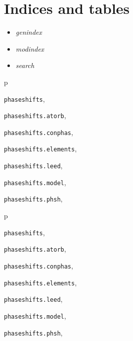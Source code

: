 \documentclass[letterpaper,10pt,english]{sphinxmanual}
\begin{document}
\chapter{Indices and tables}
\label{index:indices-and-tables}\begin{itemize}
\item {} 
\emph{genindex}

\item {} 
\emph{modindex}

\item {} 
\emph{search}

\end{itemize}


\renewcommand{\indexname}{Python Module Index}
\begin{theindex}
\def\bigletter#1{{\Large\sffamily#1}\nopagebreak\vspace{1mm}}
\bigletter{p}
\item {\texttt{phaseshifts}}, \pageref{modules:module-phaseshifts}
\item {\texttt{phaseshifts.atorb}}, \pageref{modules:module-phaseshifts.atorb}
\item {\texttt{phaseshifts.conphas}}, \pageref{modules:module-phaseshifts.conphas}
\item {\texttt{phaseshifts.elements}}, \pageref{modules:module-phaseshifts.elements}
\item {\texttt{phaseshifts.leed}}, \pageref{modules:module-phaseshifts.leed}
\item {\texttt{phaseshifts.model}}, \pageref{modules:module-phaseshifts.model}
\item {\texttt{phaseshifts.phsh}}, \pageref{modules:module-phaseshifts.phsh}
\end{theindex}
\renewcommand{\indexname}{Python Module Index}
\begin{theindex}
\def\bigletter#1{{\Large\sffamily#1}\nopagebreak\vspace{1mm}}
\bigletter{p}
\item {\texttt{phaseshifts}}, \pageref{modules:module-phaseshifts}
\item {\texttt{phaseshifts.atorb}}, \pageref{modules:module-phaseshifts.atorb}
\item {\texttt{phaseshifts.conphas}}, \pageref{modules:module-phaseshifts.conphas}
\item {\texttt{phaseshifts.elements}}, \pageref{modules:module-phaseshifts.elements}
\item {\texttt{phaseshifts.leed}}, \pageref{modules:module-phaseshifts.leed}
\item {\texttt{phaseshifts.model}}, \pageref{modules:module-phaseshifts.model}
\item {\texttt{phaseshifts.phsh}}, \pageref{modules:module-phaseshifts.phsh}
\end{theindex}

\renewcommand{\indexname}{Index}
\printindex
\end{document}
